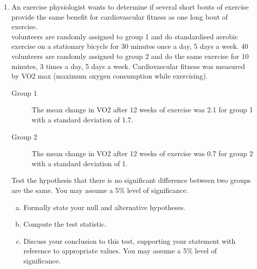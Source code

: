 \documentclass[]{article}
\begin{document}
\begin{enumerate}
\begin{enumerate}[(a)]
\end{enumerate}
\item An exercise physiologist wants to determine if several short bouts of exercise provide the same benefit for cardiovascular fitness as one long bout of exercise. \\
	 volunteers are randomly assigned to group 1 and do standardised aerobic exercise on a stationary bicycle for 30 minutes once a day, 5 days a week. 40 volunteers are randomly assigned to group 2 and do the same exercise for 10 minutes, 3 times a day, 5 days a week. Cardiovascular fitness was measured by VO2 max (maximum oxygen consumption while exercising). 
	\begin{framed}
	\begin{description}
		\item[Group 1] The mean change in VO2 after 12 weeks of exercise was 2.1 for group 1 with a standard deviation of 1.7.
		\item[Group 2] The mean change in VO2 after 12 weeks of exercise was 0.7 for group 2 with a standard deviation of 1. 
	\end{description}
	\end{framed}
	\noindent Test the hypothesis that there is no significant difference between two groups are the same. You may assume a 5\% level of significance.
	
\begin{enumerate}[(a)]
		\item Formally state your null and alternative hypotheses.
		\item Compute the test statistic.
		\item Discuss your conclusion to this test, supporting your statement with reference to appropriate values. You may assume a 5\% level of significance.
\end{enumerate}



\end{enumerate}
\end{document}
